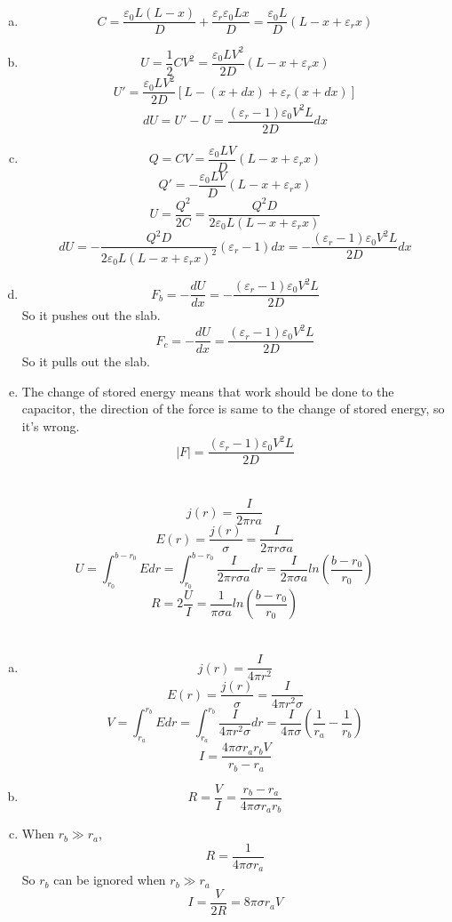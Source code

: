 \documentclass{article}
\begin{document}
\section{}
\begin{enumerate}[(a)]
\item
$$C=\frac{\varepsilon_0L(L-x)}{D}+\frac{\varepsilon_r\varepsilon_0Lx}{D}=\frac{\varepsilon_0L}{D}(L-x+\varepsilon_rx)$$
\item
$$U=\frac{1}{2}CV^2=\frac{\varepsilon_0LV^2}{2D}(L-x+\varepsilon_rx)$$
$$U'=\frac{\varepsilon_0LV^2}{2D}[L-(x+dx)+\varepsilon_r(x+dx)]$$
$$dU=U'-U=\frac{(\varepsilon_r-1)\varepsilon_0V^2L}{2D}dx$$
\item
$$Q=CV=\frac{\varepsilon_0LV}{D}(L-x+\varepsilon_rx)$$
$$Q'=-\frac{\varepsilon_0LV}{D}(L-x+\varepsilon_rx)$$
$$U=\frac{Q^2}{2C}=\frac{Q^2D}{2\varepsilon_0L(L-x+\varepsilon_rx)}$$
$$dU=-\frac{Q^2D}{2\varepsilon_0L(L-x+\varepsilon_rx)^2}(\varepsilon_r-1)dx=-\frac{(\varepsilon_r-1)\varepsilon_0V^2L}{2D}dx$$
\item
$$F_b=-\frac{dU}{dx}=-\frac{(\varepsilon_r-1)\varepsilon_0V^2L}{2D}$$
So it pushes out the slab.
$$F_c=-\frac{dU}{dx}=\frac{(\varepsilon_r-1)\varepsilon_0V^2L}{2D}$$
So it pulls out the slab.
\item
The change of stored energy means that work should be done to the capacitor, the direction of the force is same to the change of stored energy, so it's wrong.
$$|F|=\frac{(\varepsilon_r-1)\varepsilon_0V^2L}{2D}$$
\end{enumerate}

\section{}
$$j(r)=\frac{I}{2\pi ra}$$
$$E(r)=\frac{j(r)}{\sigma}=\frac{I}{2\pi r\sigma a}$$
$$U=\int_{r_0}^{b-r_0}Edr=\int_{r_0}^{b-r_0}\frac{I}{2\pi r\sigma a}dr=\frac{I}{2\pi\sigma a}ln(\frac{b-r_0}{r_0})$$
$$R=2\frac{U}{I}=\frac{1}{\pi\sigma a}ln(\frac{b-r_0}{r_0})$$

\section{}
\begin{enumerate}[(a)]
\item
$$j(r)=\frac{I}{4\pi r^2}$$
$$E(r)=\frac{j(r)}{\sigma}=\frac{I}{4\pi r^2\sigma}$$
$$V=\int_{r_a}^{r_b}Edr=\int_{r_a}^{r_b}\frac{I}{4\pi r^2\sigma}dr=\frac{I}{4\pi\sigma}\left(\frac{1}{r_a}-\frac{1}{r_b}\right)$$
$$I=\frac{4\pi\sigma r_ar_bV}{r_b-r_a}$$
\item
$$R=\frac{V}{I}=\frac{r_b-r_a}{4\pi\sigma r_ar_b}$$
\item
When $r_b\gg r_a$,
$$R=\frac{1}{4\pi\sigma r_a}$$
So $r_b$ can be ignored when $r_b\gg r_a$
$$I=\frac{V}{2R}=8\pi\sigma r_aV$$
\end{enumerate}
\end{document}
